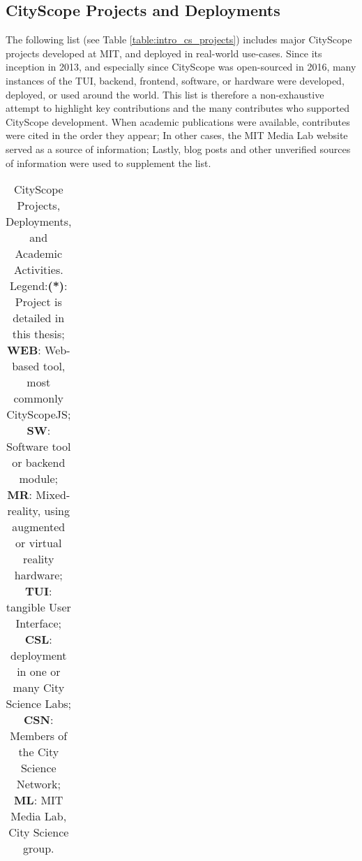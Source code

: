 \begin{rotatepage}
    \begin{landscape}

        \subsection{CityScope Projects and Deployments}
        {
            The following list (see Table \eqref{table:intro_cs_projects}) includes major CityScope projects developed at MIT, and deployed in real-world use-cases. Since its inception in 2013, and especially since CityScope was open-sourced in 2016, many instances of the TUI, backend, frontend, software, or hardware were developed, deployed, or used around the world. This list is therefore a non-exhaustive attempt to highlight key contributions and the many contributes who supported CityScope development. When academic publications were available, contributes were cited in the order they appear; In other cases, the MIT Media Lab website served as a source of information; Lastly, blog posts and other unverified sources of information were used to supplement the list.
        }


        \scriptsize
        \begin{longtable}
            {>{\raggedright}p{}>{\raggedright}p{}p{}p{}p{}p{}}
            \caption[CityScope Projects]
            {
                \bigskip
                CityScope Projects, Deployments, and Academic Activities.
                \newline
                \scriptsize Legend:\textbf{(*)}: Project is detailed in this thesis; \textbf{WEB}: Web-based tool, most commonly CityScopeJS; \textbf{SW}: Software tool or backend module; \textbf{MR}: Mixed-reality, using augmented or virtual reality hardware; \textbf{TUI}: tangible User Interface; \textbf{CSL}: deployment in one or many City Science Labs; \textbf{CSN}: Members of the City Science Network; \textbf{ML}: MIT Media Lab, City Science group.
                \bigskip
            }
            \label{table:intro_cs_projects}                                                                                                                                                                                                                                                                                                                                                                                                                   \\


\end{longtable}
\end{landscape}
\end{rotatepage}
